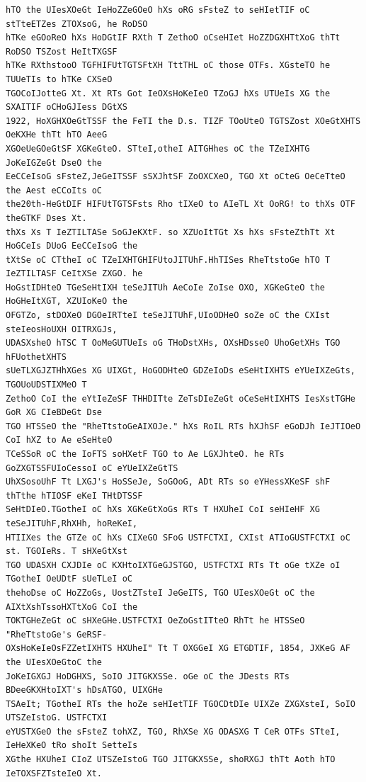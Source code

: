 \documentclass[12pt,a4paper]{article}
\begin{document}
\begin{lstlisting}[style=ciphertext,caption={Complete text after iteration 3}]
hTO the UIesXOeGt IeHoZZeGOeO hXs oRG sFsteZ to seHIetTIF oC stTteETZes ZTOXsoG, he RoDSO
hTKe eGOoReO hXs HoDGtIF RXth T ZethoO oCseHIet HoZZDGXHTtXoG thTt RoDSO TSZost HeItTXGSF
hTKe RXthstooO TGFHIFUtTGTSFtXH TttTHL oC those OTFs. XGsteTO he TUUeTIs to hTKe CXSeO
TGOCoIJotteG Xt. Xt RTs Got IeOXsHoKeIeO TZoGJ hXs UTUeIs XG the SXAITIF oCHoGJIess DGtXS
1922, HoXGHXOeGtTSSF the FeTI the D.s. TIZF TOoUteO TGTSZost XOeGtXHTS OeKXHe thTt hTO AeeG
XGOeUeGOeGtSF XGKeGteO. STteI,otheI AITGHhes oC the TZeIXHTG JoKeIGZeGt DseO the
EeCCeIsoG sFsteZ,JeGeITSSF sSXJhtSF ZoOXCXeO, TGO Xt oCteG OeCeTteO the Aest eCCoIts oC
the20th-HeGtDIF HIFUtTGTSFsts Rho tIXeO to AIeTL Xt OoRG! to thXs OTF theGTKF Dses Xt.
thXs Xs T IeZTILTASe SoGJeKXtF. so XZUoItTGt Xs hXs sFsteZthTt Xt HoGCeIs DUoG EeCCeIsoG the
tXtSe oC CTtheI oC TZeIXHTGHIFUtoJITUhF.HhTISes RheTtstoGe hTO T IeZTILTASF CeItXSe ZXGO. he
HoGstIDHteO TGeSeHtIXH teSeJITUh AeCoIe ZoIse OXO, XGKeGteO the HoGHeItXGT, XZUIoKeO the
OFGTZo, stDOXeO DGOeIRTteI teSeJITUhF,UIoODHeO soZe oC the CXIst steIeosHoUXH OITRXGJs,
UDASXsheO hTSC T OoMeGUTUeIs oG THoDstXHs, OXsHDsseO UhoGetXHs TGO hFUothetXHTS
sUeTLXGJZTHhXGes XG UIXGt, HoGODHteO GDZeIoDs eSeHtIXHTS eYUeIXZeGts, TGOUoUDSTIXMeO T
ZethoO CoI the eYtIeZeSF THHDITte ZeTsDIeZeGt oCeSeHtIXHTS IesXstTGHe GoR XG CIeBDeGt Dse
TGO HTSSeO the "RheTtstoGeAIXOJe." hXs RoIL RTs hXJhSF eGoDJh IeJTIOeO CoI hXZ to Ae eSeHteO
TCeSSoR oC the IoFTS soHXetF TGO to Ae LGXJhteO. he RTs GoZXGTSSFUIoCessoI oC eYUeIXZeGtTS
UhXSosoUhF Tt LXGJ's HoSSeJe, SoGOoG, ADt RTs so eYHessXKeSF shF thTthe hTIOSF eKeI THtDTSSF
SeHtDIeO.TGotheI oC hXs XGKeGtXoGs RTs T HXUheI CoI seHIeHF XG teSeJITUhF,RhXHh, hoReKeI,
HTIIXes the GTZe oC hXs CIXeGO SFoG USTFCTXI, CXIst ATIoGUSTFCTXI oC st. TGOIeRs. T sHXeGtXst
TGO UDASXH CXJDIe oC KXHtoIXTGeGJSTGO, USTFCTXI RTs Tt oGe tXZe oI TGotheI OeUDtF sUeTLeI oC
thehoDse oC HoZZoGs, UostZTsteI JeGeITS, TGO UIesXOeGt oC the AIXtXshTssoHXTtXoG CoI the
TOKTGHeZeGt oC sHXeGHe.USTFCTXI OeZoGstITteO RhTt he HTSSeO "RheTtstoGe's GeRSF-
OXsHoKeIeOsFZZetIXHTS HXUheI" Tt T OXGGeI XG ETGDTIF, 1854, JXKeG AF the UIesXOeGtoC the
JoKeIGXGJ HoDGHXS, SoIO JITGKXSSe. oGe oC the JDests RTs BDeeGKXHtoIXT's hDsATGO, UIXGHe
TSAeIt; TGotheI RTs the hoZe seHIetTIF TGOCDtDIe UIXZe ZXGXsteI, SoIO UTSZeIstoG. USTFCTXI
eYUSTXGeO the sFsteZ tohXZ, TGO, RhXSe XG ODASXG T CeR OTFs STteI, IeHeXKeO tRo shoIt SetteIs
XGthe HXUheI CIoZ UTSZeIstoG TGO JITGKXSSe, shoRXGJ thTt Aoth hTO IeTOXSFZTsteIeO Xt.
\end{lstlisting}
\end{document}
